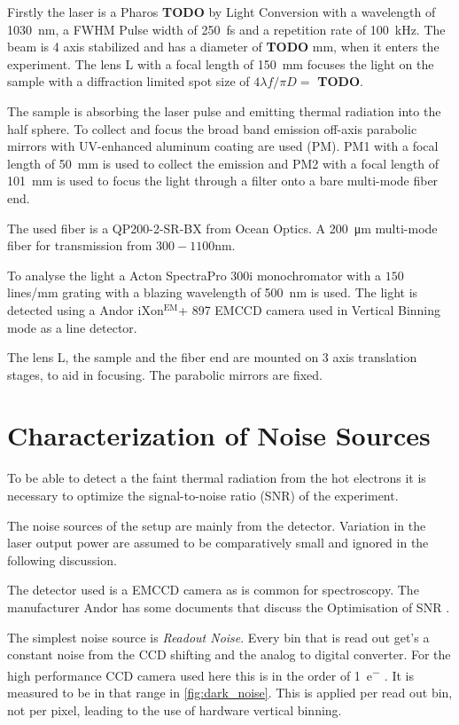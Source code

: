 \documentclass[
	parskip=half,
	a4paper,
]{scrarticle}
\begin{document}
Firstly the laser is a Pharos \textbf{TODO} by Light Conversion with a wavelength of \SI{1030}{nm}, a FWHM Pulse width of \SI{250}{fs} and a repetition rate of \SI{100}{kHz}.
The beam is 4 axis stabilized and has a diameter of \textbf{TODO} \si{mm}, when it enters the experiment.
The lens \textsf{L} with a focal length of \SI{150}{mm} focuses the light on the sample with a diffraction limited spot size of $4 \lambda f / \pi D = $ \textbf{TODO}.

The sample is absorbing the laser pulse and emitting thermal radiation into the half sphere.
To collect and focus the broad band emission off-axis parabolic mirrors with  UV-enhanced aluminum coating are used (\textsf{PM}).
\textsf{PM1} with a focal length of \SI{50}{mm} is used to collect the emission and \textsf{PM2} with a focal length of \SI{101}{mm} is used to focus the light through a filter onto a bare multi-mode fiber end.

The used fiber is a QP200-2-SR-BX from Ocean Optics. A \SI{200}{\micro m} multi-mode fiber for transmission from $300-1100$\;\si{nm}.

To analyse the light a Acton SpectraPro 300i monochromator with a $150$\;lines/mm grating with a blazing wavelength of \SI{500}{nm} is used.
The light is detected using a Andor iXon$^\text{EM}$+ 897 EMCCD camera used in Vertical Binning mode as a line detector.

The lens \textsf{L}, the sample and the fiber end are mounted on 3 axis translation stages, to aid in focusing. The parabolic mirrors are fixed.

\section{Characterization of Noise Sources}
To be able to detect a the faint thermal radiation from the hot electrons it is necessary to optimize the signal-to-noise ratio (SNR) of the experiment.

The noise sources of the setup are mainly from the detector.
Variation in the laser output power are assumed to be comparatively small and ignored in the following discussion.

The detector used is a EMCCD camera as is common for spectroscopy. The manufacturer Andor has some documents that discuss the Optimisation of SNR \cite{andor_establishing_nodate,dr_jo_walters_sensitivity_2023}.

The simplest noise source is \textit{Readout Noise}. Every bin that is read out get's a constant noise from the CCD shifting and the analog to digital converter. For the high performance CCD camera used here this is in the order of \SI{1}{e^-} \cite{andor_ixonem_nodate}. It is measured to be in that range in \autoref{fig:dark_noise}.
This is applied per read out bin, not per pixel, leading to the use of hardware vertical binning.
\end{document}
